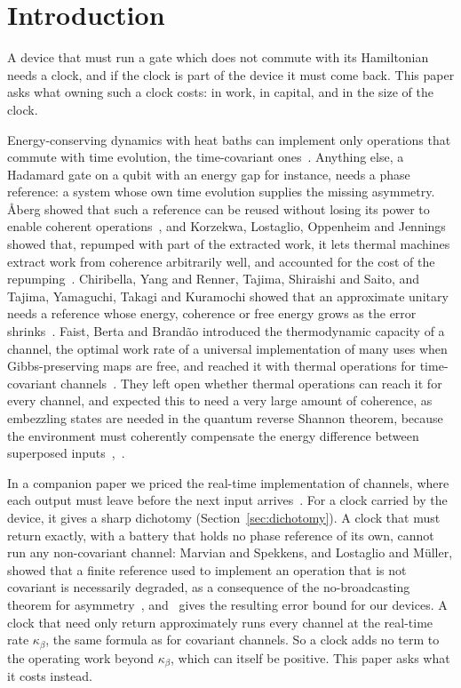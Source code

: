 \documentclass[11pt]{article}
\theoremstyle{definition}
\theoremstyle{remark}
\newcommand{\Trt}{\kappa_\beta}
\begin{document}
\section{Introduction}\label{sec:intro}

A device that must run a gate which does not commute with its Hamiltonian needs a clock, and if the clock is part of the device it must come back. This paper asks what owning such a clock costs: in work, in capital, and in the size of the clock.

Energy-conserving dynamics with heat baths can implement only operations that commute with time evolution, the time-covariant ones~\cite{Lostaglio15,FBB21}. Anything else, a Hadamard gate on a qubit with an energy gap for instance, needs a phase reference: a system whose own time evolution supplies the missing asymmetry. {\AA}berg showed that such a reference can be reused without losing its power to enable coherent operations~\cite{Aberg14}, and Korzekwa, Lostaglio, Oppenheim and Jennings showed that, repumped with part of the extracted work, it lets thermal machines extract work from coherence arbitrarily well, and accounted for the cost of the repumping~\cite{KLOJ16}. Chiribella, Yang and Renner, Tajima, Shiraishi and Saito, and Tajima, Yamaguchi, Takagi and Kuramochi showed that an approximate unitary needs a reference whose energy, coherence or free energy grows as the error shrinks~\cite{ChiribellaYangRenner21,TSS20,TYTK25}. Faist, Berta and Brand\~ao introduced the thermodynamic capacity of a channel, the optimal work rate of a universal implementation of many uses when Gibbs-preserving maps are free, and reached it with thermal operations for time-covariant channels~\cite{FBB19,FBB21}. They left open whether thermal operations can reach it for every channel, and expected this to need a very large amount of coherence, as embezzling states are needed in the quantum reverse Shannon theorem, because the environment must coherently compensate the energy difference between superposed inputs~\cite{FBB19},~\cite[Sec.~9]{FBB21}.

In a companion paper we priced the real-time implementation of channels, where each output must leave before the next input arrives~\cite{SaveWork}. For a clock carried by the device, it gives a sharp dichotomy (Section~\ref{sec:dichotomy}). A clock that must return exactly, with a battery that holds no phase reference of its own, cannot run any non-covariant channel: Marvian and Spekkens, and Lostaglio and M\"uller, showed that a finite reference used to implement an operation that is not covariant is necessarily degraded, as a consequence of the no-broadcasting theorem for asymmetry~\cite{MarvianSpekkens19,LostaglioMuller19}, and~\cite{SaveWork} gives the resulting error bound for our devices. A clock that need only return approximately runs every channel at the real-time rate $\Trt$, the same formula as for covariant channels. So a clock adds no term to the operating work beyond $\Trt$, which can itself be positive. This paper asks what it costs instead.
\end{document}

